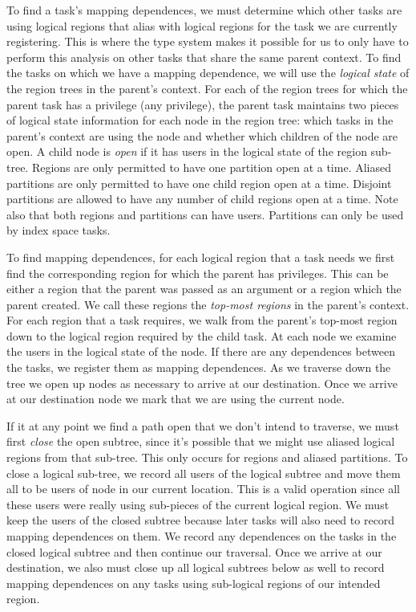 To find a task's mapping dependences, we must determine which other tasks are using logical regions 
that alias with logical regions for the task we are currently registering.  This is where the type 
system makes it possible for us to only have to perform this analysis on other tasks that share 
the same parent context.  To find the tasks on which we have a mapping dependence, we will use the 
{\em logical state} of the region trees in the parent's context.  For each of the region trees for which 
the parent task has a privilege (any privilege), the parent task maintains two pieces of logical 
state information for each node in the region tree: which tasks in the parent's context are using 
the node and whether which children of the node are open.   A child node is {\em open} if it has users 
in the logical state of the region sub-tree.  Regions are only permitted to have one partition open 
at a time.  Aliased partitions are only permitted to have one child region open at a time.  Disjoint 
partitions are allowed to have any number of child regions open at a time.  Note also that both 
regions and partitions can have users.  Partitions can only be used by index space tasks.

To find mapping dependences, for each logical region that a task needs we first find the 
corresponding region for which the parent has privileges.  This can be either a region that the 
parent was passed as an argument or a region which the parent created.  We call these regions the 
{\em top-most regions} in the parent's context.  For each region that a task requires, we walk from the 
parent's top-most region down to the logical region required by the child task.  At each node we 
examine the users in the logical state of the node.  If there are any dependences between the 
tasks, we register them as mapping dependences.  As we traverse down the tree we open up nodes 
as necessary to arrive at our destination.  Once we arrive at our destination node we mark that 
we are using the current node.

If it at any point we find a path open that we don't intend to traverse, we must first {\em close}
the open subtree, since it's possible that we might use aliased logical regions from that sub-tree.  
This only occurs for regions and aliased partitions.  To close a logical sub-tree, we record all 
users of the logical subtree and move them all to be users of node in our current location.  
This is a valid operation since all these users were really using sub-pieces of the current logical 
region.  We must keep the users of the closed subtree because later tasks will also need to record 
mapping dependences on them.  We record any dependences on the tasks in the closed logical subtree 
and then continue our traversal.  Once we arrive at our destination, we also must close up all 
logical subtrees below as well to record mapping dependences on any tasks using sub-logical regions 
of our intended region.


